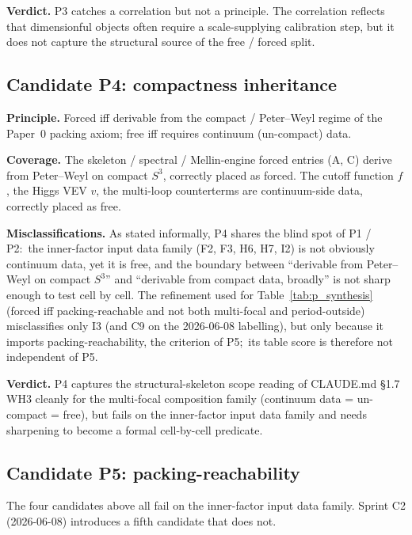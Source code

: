 \documentclass[11pt,a4paper]{article}
\theoremstyle{plain}
\theoremstyle{definition}
\newcommand{\sphere}[1]{S^{#1}}
\begin{document}
\textbf{Verdict.}  P3 catches a correlation but not a principle. The correlation reflects that dimensionful objects often require a scale-supplying calibration step, but it does not capture the structural source of the free / forced split.

\subsection{Candidate P4:  compactness inheritance}
\label{sec:p4}

\textbf{Principle.}  Forced iff derivable from the compact / Peter--Weyl regime of the Paper~0 packing axiom; free iff requires continuum (un-compact) data.

\textbf{Coverage.}  The skeleton / spectral / Mellin-engine forced entries (A, C) derive from Peter--Weyl on compact $\sphere{3}$, correctly placed as forced. The cutoff function $f$, the Higgs VEV $v$, the multi-loop counterterms are continuum-side data, correctly placed as free.

\textbf{Misclassifications.}  As stated informally, P4 shares the blind spot of P1 / P2:\ the inner-factor input data family (F2, F3, H6, H7, I2) is not obviously continuum data, yet it is free, and the boundary between ``derivable from Peter--Weyl on compact $\sphere{3}$'' and ``derivable from compact data, broadly'' is not sharp enough to test cell by cell.  The refinement used for Table~\ref{tab:p_synthesis} (forced iff packing-reachable and not both multi-focal and period-outside) misclassifies only I3 (and C9 on the 2026-06-08 labelling), but only because it imports packing-reachability, the criterion of P5;\ its table score is therefore not independent of P5.

\textbf{Verdict.}  P4 captures the structural-skeleton scope reading of CLAUDE.md \S 1.7 WH3 cleanly for the multi-focal composition family (continuum data = un-compact = free), but fails on the inner-factor input data family and needs sharpening to become a formal cell-by-cell predicate.

\subsection{Candidate P5:  packing-reachability}
\label{sec:p5}

The four candidates above all fail on the inner-factor input data family. Sprint C2 (2026-06-08) introduces a fifth candidate that does not.
\end{document}
